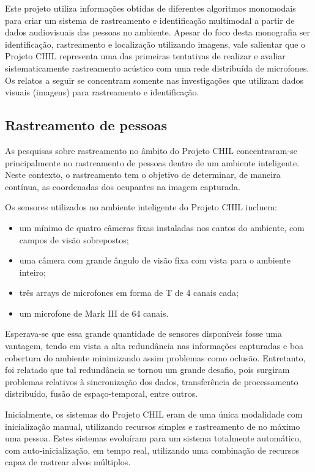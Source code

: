 Este projeto utiliza informações obtidas de diferentes algoritmos monomodais para criar um sistema de rastreamento e identificação multimodal a partir de dados audiovisuais das pessoas no ambiente. Apesar do foco desta monografia ser identificação, rastreamento e localização utilizando imagens, vale salientar que o Projeto CHIL representa uma das primeiras tentativas de realizar e avaliar sistematicamente rastreamento acústico com uma rede distribuída de microfones. Os relatos a seguir se concentram somente nas investigações que utilizam dados visuais (imagens) para rastreamento e identificação. 

\subsection{Rastreamento de pessoas}

As pesquisas sobre rastreamento no âmbito do Projeto CHIL concentraram-se principalmente no rastreamento de pessoas dentro de um ambiente inteligente. Neste contexto, o rastreamento tem o objetivo de determinar,  de maneira contínua, as coordenadas dos ocupantes na imagem capturada.

Os sensores utilizados no ambiente inteligente do Projeto CHIL incluem:	
	\begin{itemize}
		\item um mínimo de quatro câmeras fixas instaladas nos cantos do ambiente, com campos de visão sobrepostos;
		\item uma câmera com grande ângulo de visão fixa com vista para o ambiente inteiro;
		\item três arrays de microfones em forma de T de 4 canais cada;
		\item um microfone de Mark III de 64 canais.
	\end{itemize}

Esperava-se que essa grande quantidade de sensores disponíveis fosse uma vantagem, tendo em vista a alta redundância nas informações capturadas e boa cobertura do ambiente minimizando assim problemas como oclusão. Entretanto, foi relatado que tal redundância se tornou um grande desafio, pois surgiram problemas relativos à sincronização dos dados, transferência de processamento distribuído, fusão de espaço-temporal, entre outros.

Inicialmente, os sistemas do Projeto CHIL eram de uma única modalidade com inicialização manual, utilizando recursos simples e rastreamento de no máximo uma pessoa. Estes sistemas evoluíram para um sistema totalmente automático, com auto-inicialização, em tempo real, utilizando uma combinação de recursos capaz de rastrear alvos múltiplos.


